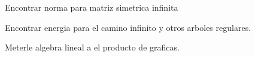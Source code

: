 Encontrar norma para matriz simetrica infinita

Encontrar energia para el camino infinito y otros arboles regulares.

Meterle algebra lineal a el producto de graficas.



